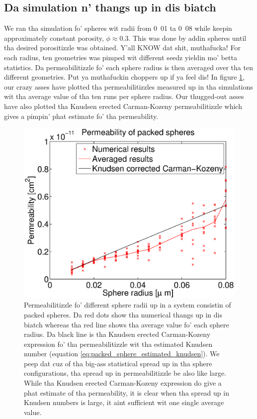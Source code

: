 \subsection{Da simulation n' thangs up in dis biatch}
We ran tha simulation fo' spheres wit radii from \unit{0.01}{\micro\meter} ta \unit{0.08}{\micro\meter} while keepin approximately constant porosity, $\phi\approx 0.3$. This was done by addin spheres until tha desired porositizzle was obtained. Y'all KNOW dat shit, muthafucka! For each radius, ten geometries was pimped wit different seedz yieldin mo' betta statistics. Da permeabilitizzle fo' each sphere radius is then averaged over tha ten different geometries. Put ya muthafuckin choppers up if ya feel dis! In figure \ref{fig:packed_spheres_permeability}, our crazy asses have plotted tha permeabilitizzles measured up in tha simulations wit tha average value of tha ten runs per sphere radius. Our thugged-out asses have also plotted tha Knudsen erected Carman-Kozeny permeabilitizzle which gives a pimpin' phat estimate fo' tha permeability. 
\begin{figure}[h]
\begin{center}
\includegraphics[width=\textwidth, trim=0cm 0cm 0cm 0cm, clip]{DSMC/figures/permeability_packed_spheres.eps}
\end{center}
\caption{Permeabilitizzle fo' different sphere radii up in a system consistin of packed spheres. Da red dots show tha numerical thangs up in dis biatch whereas tha red line shows tha average value fo' each sphere radius. Da black line is tha Knudsen erected Carman-Kozeny expression fo' tha permeabilitizzle wit tha estimated Knudsen number (equation \eqref{eq:packed_sphere_estimated_knudsen}). We peep dat cuz of tha big-ass statistical spread up in tha sphere configurations, tha spread up in permeabilitizzle be also like large. While tha Knudsen erected Carman-Kozeny expression do give a phat estimate of tha permeability, it is clear when tha spread up in Knudsen numbers is large, it aint sufficient wit one single average value.}
\label{fig:packed_spheres_permeability}
\end{figure}